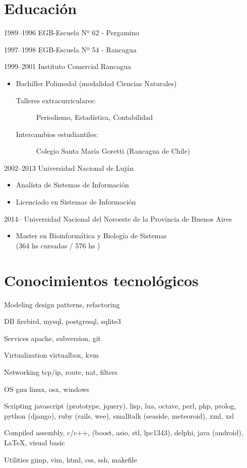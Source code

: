 \documentclass[a4paper]{article}
\begin{document}
\section{Educaci{\'o}n}
\begin{CV}
\item[1989--1996] EGB-Escuela Nº 62 - Pergamino
\item[1997--1998] EGB-Escuela Nº 54 - Rancagua
\item[1999--2001] Instituto Comercial Rancagua
  \begin{itemize}
  \item Bachiller Polimodal (modalidad Ciencias Naturales)
  	\begin{description}
  	\item[Talleres extracurriculares: ] Periodismo, Estad{\'i}stica, Contabilidad
  	\item[Intercambios estudiantiles: ] Colegio Santa Mar{\'i}a Goretti (Rancagua de Chile)
  	\end{description}
  \end{itemize}
\item[2002--2013] Universidad Nacional de Luj{\'a}n
  \begin{itemize}
  \item Anal{\'i}sta de Sistemas de Informaci{\'o}n
  \item Licenciado en Sistemas de Informaci{\'o}n
  \end{itemize}
\item[2014--    ] Universidad Nacional del Noroeste de la Provincia de Buenos Aires
  \begin{itemize}
  \item Master en Bioinform{\'a}tica y Biolog{\'i}a de Sistemas \\ (364 hs cursadas / 576 hs )
  \end{itemize}
\end{CV}

\section{Conocimientos tecnol{\'o}gicos}
\begin{CV}
\item[Modeling] design patterns, refactoring
\item[DB] firebird, mysql, postgresql, sqlite3
\item[Services] apache, subversion, git
\item[Virtualization] virtualbox, kvm
\item[Networking] tcp/ip, route, nat, filters
\item[OS] gnu linux, osx, windows
\item[Scripting] javascript (prototype, jquery), lisp, lua, octave, perl, php, prolog, python (django), ruby (rails, wee), smalltalk (seaside, meteoroid), xml, xsl
\item[Compiled] assembly, c/c++, (boost, asio, stl, lpc1343), delphi, java (android), \LaTeX, visual basic
\item[Utilities] gimp, vim, html, css, ssh, makefile
\end{CV}
\end{document}
